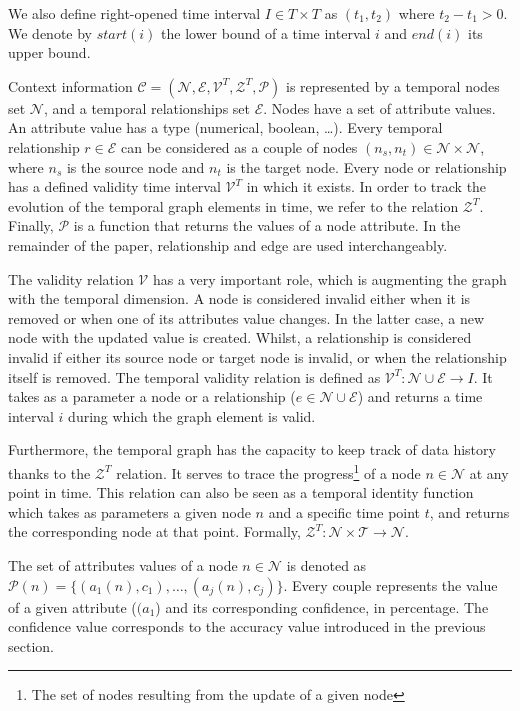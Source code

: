 We also define right-opened time interval $I \in T \times T$ as $(t_1, t_2)$ where $t_2 - t_1 > 0$. 
We denote by $start(i)$ the lower bound of a time interval $i$ and $end(i)$ its upper bound.

Context information $\mathcal{C}=(\mathcal{N},\mathcal{E},\mathcal{V}^T, \mathcal{Z}^T, \mathcal{P})$ is represented by a temporal nodes set $\mathcal{N}$,  and a temporal relationships set $\mathcal{E}$. Nodes have a set of attribute values. An attribute value has a type (numerical, boolean, \ldots). Every temporal relationship $r \in \mathcal{E}$ can be considered as a couple of nodes $(n_s, n_t) \in \mathcal{N} \times \mathcal{N}$, where $n_s$ is the source node and $n_t$ is the target node. 
Every node or relationship has a defined validity time interval $\mathcal{V}^T$ in which it exists. 
In order to track the evolution of the temporal graph elements in time, we refer to the relation $\mathcal{Z}^T$. Finally, $\mathcal{P}$ is a function that returns the values of a node attribute. 
In the remainder of the paper, relationship and edge are used interchangeably.

The validity relation $\mathcal{V}$ has a very important role, which is augmenting the graph with the temporal dimension. A node is considered invalid either when it is removed or when one of its attributes value changes. In the latter case, a new node with the updated value is created. Whilst, a relationship is considered invalid if either its source node or target node is invalid, or when the relationship itself is removed. The temporal validity relation is defined as $\mathcal{V}^T: \mathcal{N} \cup \mathcal{E} \rightarrow I$. It takes as a parameter a node or a relationship ($e \in\mathcal{N}\cup \mathcal{E}$) and returns a time interval $i$ during which the graph element is valid.
 
Furthermore, the temporal graph has the capacity to keep track of data history thanks to the $\mathcal{Z}^T$ relation. It serves to trace the progress\footnote{The set of nodes resulting from the update of a given node} of a node $n \in \mathcal{N}$ at any point in time. This relation can also be seen as a temporal identity function which takes as parameters a given node $n$ and a specific time point $t$, and returns the corresponding node at that point. 
Formally, $\mathcal{Z}^T: \mathcal{N} \times \mathcal{T} \rightarrow \mathcal{N}$. 

 The set of attributes values of a node $n \in \mathcal{N}$  is denoted as $\mathcal{P}(n)=\{(a_1(n), c_1),\ldots,(a_j(n),c_j)\}$. Every couple represents the value of a given attribute ($(a_1$) and its corresponding confidence, in percentage. The confidence value corresponds to the accuracy value introduced in the previous section. 
 

